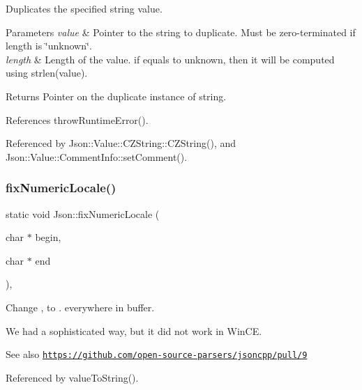 Duplicates the specified string value. 
\begin{DoxyParams}{Parameters}
{\em value} & Pointer to the string to duplicate. Must be zero-\/terminated if length is \char`\"{}unknown\char`\"{}. \\
\hline
{\em length} & Length of the value. if equals to unknown, then it will be computed using strlen(value). \\
\hline
\end{DoxyParams}
\begin{DoxyReturn}{Returns}
Pointer on the duplicate instance of string. 
\end{DoxyReturn}


References throw\+Runtime\+Error().



Referenced by Json\+::\+Value\+::\+C\+Z\+String\+::\+C\+Z\+String(), and Json\+::\+Value\+::\+Comment\+Info\+::set\+Comment().

\mbox{\label{namespaceJson_aa208904144dc7b11ccc28f47c9afab9a_aa208904144dc7b11ccc28f47c9afab9a}} 
\subsubsection{\texorpdfstring{fix\+Numeric\+Locale()}{fixNumericLocale()}}
{\footnotesize\ttfamily static void Json\+::fix\+Numeric\+Locale (\begin{DoxyParamCaption}\item[{char $\ast$}]{begin,  }\item[{char $\ast$}]{end }\end{DoxyParamCaption})\hspace{0.3cm}{\ttfamily [inline]}, {\ttfamily [static]}}

Change \textquotesingle{},\textquotesingle{} to \textquotesingle{}.\textquotesingle{} everywhere in buffer.

We had a sophisticated way, but it did not work in Win\+CE. \begin{DoxySeeAlso}{See also}
\href{https://github.com/open-source-parsers/jsoncpp/pull/9}{\tt https\+://github.\+com/open-\/source-\/parsers/jsoncpp/pull/9} 
\end{DoxySeeAlso}


Referenced by value\+To\+String().

\mbox{\label{namespaceJson_ac142c270507391c8d86f35b550d36eb4_ac142c270507391c8d86f35b550d36eb4}} 
